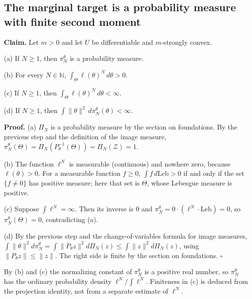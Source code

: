 \documentclass[11pt,a4paper]{report}
\begin{document}
\subsection{\texorpdfstring{The marginal target is a probability measure with finite second moment}{The marginal target is a probability measure with finite second moment}}
\label{report-step-IPLA-MarginalConcentration-lean-10}


\textbf{Claim.} Let \(m>0\) and let \(U\) be differentiable and \(m\)-strongly convex.




(a) If \(N\ge1\), then \(\pi_N^\theta\) is a probability measure.




(b) For every \(N\in\mathbb N\), \(\int_\Theta\ell(\theta)^N\,d\theta>0\).




(c) If \(N\ge1\), then \(\int_\Theta\ell(\theta)^N\,d\theta<\infty\).




(d) If \(N\ge1\), then \(\int\|\theta\|^2\,d\pi_N^\theta(\theta)<\infty\).




\textbf{Proof.} (a) \(\Pi_N\) is a probability measure by the section on foundations. By the previous step and the definition of the image measure, \(\pi_N^\theta(\Theta)=\Pi_N(P_\theta^{-1}(\Theta))=\Pi_N(\mathcal Z)=1\).




(b) The function \(\ell^N\) is measurable (continuous) and nowhere zero, because \(\ell(\theta)>0\). For a measurable function \(f\ge0\), \(\int f\,d\mathrm{Leb}>0\) if and only if the set \(\{f\ne0\}\) has positive measure; here that set is \(\Theta\), whose Lebesgue measure is positive.




(c) Suppose \(\int\ell^N=\infty\). Then its inverse is \(0\) and \(\pi_N^\theta=0\cdot(\ell^N\cdot\mathrm{Leb})=0\), so \(\pi_N^\theta(\Theta)=0\), contradicting (a).




(d) By the previous step and the change-of-variables formula for image measures, \(\int\|\theta\|^2d\pi_N^\theta=\int\|P_\theta z\|^2d\Pi_N(z)\le\int\|z\|^2d\Pi_N(z)\), using \(\|P_\theta z\|\le\|z\|\). The right side is finite by the section on foundations. \(\square\)




By (b) and (c) the normalizing constant of \(\pi_N^\theta\) is a positive real number, so \(\pi_N^\theta\) has the ordinary probability density \(\ell^N/\int\ell^N\). Finiteness in (c) is deduced from the projection identity, not from a separate estimate of \(\ell^N\).
\end{document}
